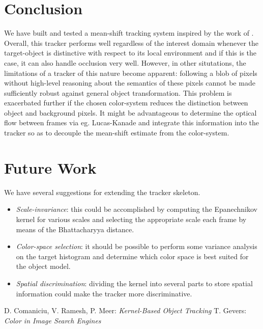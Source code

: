 \documentclass[a4paper,11pt]{article}
\begin{document}
	\section{Conclusion}
		We have built and tested a mean-shift tracking system inspired by the work of
		\cite{KBOT}. Overall, this tracker performs well regardless of the interest
		domain whenever the target-object is distinctive with respect to its local
		environment and if this is the case, it can also handle occlusion very well. 
		However, in other situtations, the limitations of a tracker of this nature
		become apparent: following a blob of pixels without high-level reasoning
		about the semantics of these pixels cannot be made sufficiently robust
		against general object transformation. This problem is exacerbated further if
		the chosen color-system reduces the distinction between object and background
		pixels. It might be advantageous to determine the optical flow between frames
		via eg. Lucas-Kanade and integrate this information into the tracker so as to
		decouple the mean-shift estimate from the color-system.

	\section{Future Work}
		We have several suggestions for extending the tracker skeleton.
		\begin{itemize}
			\item{
				\emph{Scale-invariance}: this could be accomplished by computing the
				Epanechnikov kernel for various scales and selecting the appropriate
				scale each frame by means of the Bhattacharyya distance.
			}
			\item{
				\emph{Color-space selection}: it should be possible to perform some
				variance analysis on the target histogram and determine which color
				space is best suited for the object model.
			}
			\item{
				\emph{Spatial discrimination}: dividing the kernel into several parts
				to store spatial information could make the tracker more discriminative.
			}
		\end{itemize}

	\begin{thebibliography}{2}
			D. Comaniciu, V. Ramesh, P. Meer: \textit{Kernel-Based Object Tracking}
			T. Gevers: \textit{Color in Image Search Engines}
	\end{thebibliography}
\end{document}
